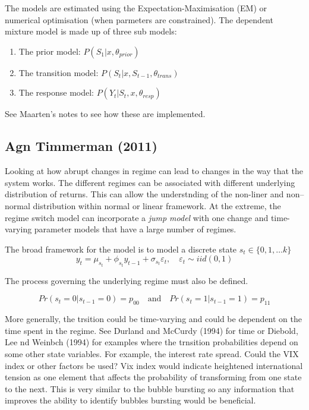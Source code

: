 \documentclass[12pt, a4paper, oneside]{article} %
\begin{document}
The models are estimated using the Expectation-Maximisation (EM) or numerical optimisation (when parmeters are constrained).  The dependent mixture model is made up of three sub models:  
\begin{enumerate}
\item The prior model: $P(S_1|x, \theta_{prior})$
\item The transition model: $P(S_t|x, S_{t-1}, \theta_{trans})$
\item The response model: $P(Y_t| S_t, x, \theta_{resp})$
\end{enumerate}
 See Maarten's notes to see how these are implemented.  
 
\subsection{Agn Timmerman (2011)}
Looking at how abrupt changes in regime can lead to changes in the way that the system works.  The different regimes can be associated with different underlying distribution of returns.  This can allow the understnding of the non-liner and non--normal distribution within  normal or linear framework.  At the extreme, the regime switch model can incorporate a \emph{jump model} with one change and time-varying parameter models that have a large number of regimes.

The broad framework for the model is to model a discrete state $s_t \in \{0,1,\dots k \}$
\begin{equation}
y_t = \mu_{s_t} + \phi_{s_t} y_{t-1} + \sigma_{s_t} \varepsilon_t, \quad \varepsilon_t \sim iid(0,1) 
\end{equation}

The process governing the underlying regime must also be defined. 

\begin{equation}
Pr(s_t = 0| s_{t-1} = 0) = p_{00} \quad \text{and} \quad Pr(s_t = 1| s_{t-1} = 1) = p_{11}
\end{equation}

More generally, the trsition could be time-varying and could be dependent on the time spent in the regime.  See Durland and McCurdy (1994) for time or Diebold, Lee nd Weinbch (1994) for examples where the trnsition probabilities depend on some other state variables.  For example, the interest rate spread.   Could the VIX index or other factors be used?  Vix index would indicate heightened international tension as one element that affects the probability of transforming from one state to the next.  This is very similar to the bubble bursting so any information that improves the ability to identify bubbles bursting would be beneficial.  
\end{document}
